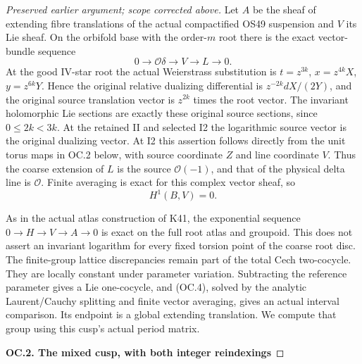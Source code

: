 \begin{proof}[Preserved earlier argument; scope corrected above]
Let \(A\) be the sheaf of extending fibre translations of the
actual compactified OS49 suspension and \(V\) its Lie sheaf.
On the orbifold base with the order-\(m\) root there is the exact
vector-bundle sequence
\[
 0\longrightarrow\mathcal O\delta\longrightarrow V
          \longrightarrow L\longrightarrow0.             \tag{OC.3}
\]
At the good IV-star root the actual Weierstrass substitution is
\(t=z^{3k}\), \(x=z^{4k}X\), \(y=z^{6k}Y\). Hence the
original relative dualizing differential is
\(z^{-2k}dX/(2Y)\), and the original source translation vector
is \(z^{2k}\) times the root vector. The invariant holomorphic
Lie sections are exactly these original source sections, since
\(0\le2k<3k\). At the retained II and selected I2 the
logarithmic source vector is the original dualizing vector. At I2
this assertion follows directly from the unit torus maps in OC.2
below, with source coordinate \(Z\) and line coordinate \(V\).
Thus the coarse extension of \(L\) is the source
\(\mathcal O(-1)\), and that of the physical delta line is
\(\mathcal O\). Finite averaging is exact for this complex
vector sheaf, so
\[
                         H^1(B,V)=0.                      \tag{OC.4}
\]

As in the actual atlas construction of K41, the exponential sequence
\(0\to H\to V\to A\to0\) is exact on the full root
atlas and groupoid. This does not assert an invariant logarithm for
every fixed torsion point of the coarse root disc. The finite-group
lattice discrepancies remain part of the total Cech two-cocycle.
They are locally constant under parameter variation. Subtracting the
reference parameter gives a Lie one-cocycle, and (OC.4), solved by
the analytic Laurent/Cauchy splitting and finite vector averaging,
gives an actual interval comparison. Its endpoint is a global
extending translation. We compute that group using this cusp's
actual period matrix.

\par

\medskip\noindent\textbf{OC.2. The mixed cusp, with both integer reindexings}

\par\nobreak


\end{proof}
